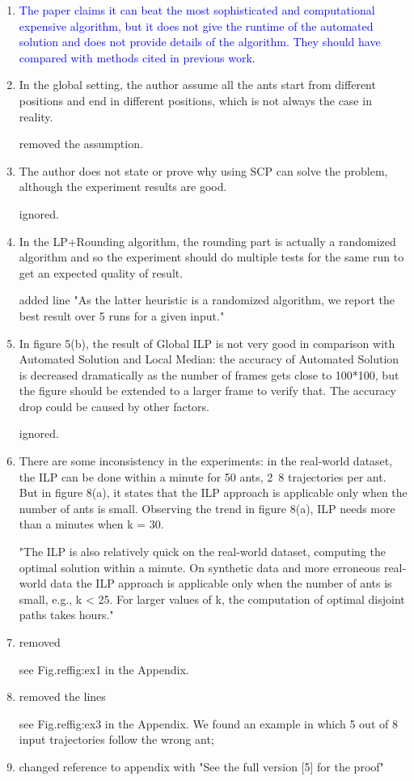 \documentclass[12pt]{article}
\begin{document}
\begin{enumerate}
\item \textcolor{blue}{The paper claims it can beat the most sophisticated and computational expensive algorithm, but it does not give the runtime of the automated solution and does not provide details of the algorithm. They should have compared with methods cited in previous work.}

\item {In the global setting, the author assume all the ants start from different positions and end in different positions, which is not always the case in reality.}

removed the assumption.

\item {The author does not state or prove why using SCP can solve the problem, although the experiment results are good.}

ignored.

\item {In the LP+Rounding algorithm, the rounding part is actually a randomized algorithm and so the experiment should do multiple tests for the same run to get an expected quality of result.
}

added line "As the latter heuristic is a randomized algorithm, we report the best
result over 5 runs for a given input."

\item {In figure 5(b), the result of Global ILP is not very good in comparison with Automated Solution and Local Median: the accuracy of Automated Solution is decreased dramatically as the number of frames gets close to 100*100, but the figure should be extended to a larger frame to verify that. The accuracy drop could be caused by other factors.}

ignored.

\item {There are some inconsistency in the experiments: in the real-world dataset, the ILP can be done within a minute for 50 ants, 2~8 trajectories per ant. But in figure 8(a), it states that the ILP approach is applicable only when the number of ants is small. Observing the trend in figure 8(a), ILP needs more than a minutes when k = 30.
}

"The ILP is also relatively quick on the real-world dataset, computing the optimal solution
within a minute. On synthetic data and more erroneous real-world data 
the ILP approach is applicable only when the number of ants is
small, e.g., k < 25. For larger values of k, the computation of optimal disjoint paths
takes hours."

\item removed 

see Fig.ref{fig:ex1} in the Appendix. 
\item removed 
the lines 

see Fig.ref{fig:ex3} in the Appendix.
We found an example in which 5 out of 8 input trajectories follow the
wrong ant;

\item changed reference to appendix with "See the full version [5] for the proof" 
\end{enumerate}
\end{document}
